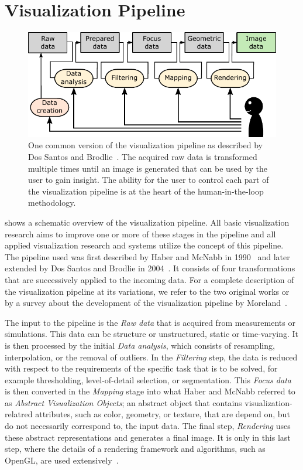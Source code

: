 \section{Visualization Pipeline} \label{cha:intro:vp}
\begin{figure}
  \centering
  \includegraphics[width=\textwidth]{figures/intro/pipeline.pdf}
  \caption{One common version of the visualization pipeline as described by Dos Santos and Brodlie~\cite{dos2004gaining}.  The acquired raw data is transformed multiple times until an image is generated that can be used by the user to gain insight.  The ability for the user to control each part of the visualization pipeline is at the heart of the human-in-the-loop methodology.}
  \label{fig:intro:vp}
\end{figure}

 shows a schematic overview of the visualization pipeline.  All basic visualization research aims to improve one or more of these stages in the pipeline and all applied visualization research and systems utilize the concept of this pipeline.  The pipeline used was first described by Haber and McNabb in 1990~\cite{haber1990visualization} and later extended by Dos Santos and Brodlie in 2004~\cite{dos2004gaining}. It consists of four transformations that are successively applied to the incoming data.  For a complete description of the visualization pipeline at its variations, we refer to the two original works or by a survey about the development of the visualization pipeline by Moreland~\cite{moreland2013survey}.

The input to the pipeline is the \emph{Raw data} that is acquired from measurements or simulations.  This data can be structure or unstructured, static or time-varying.  It is then processed by the initial \emph{Data analysis}, which consists of resampling, interpolation, or the removal of outliers.  In the \emph{Filtering} step, the data is reduced with respect to the requirements of the specific task that is to be solved, for example thresholding, level-of-detail selection, or segmentation.  This \emph{Focus data} is then converted in the \emph{Mapping} stage into what Haber and McNabb referred to as \emph{Abstract Visualization Objects}; an abstract object that contains visualization-relatred attributes, such as color, geometry, or texture, that are depend on, but do not necessarily correspond to, the input data.  The final step, \emph{Rendering} uses these abstract representations and generates a final image.  It is only in this last step, where the details of a rendering framework and algorithms, such as OpenGL, are used extensively~\cite{segal2016opengl}.

